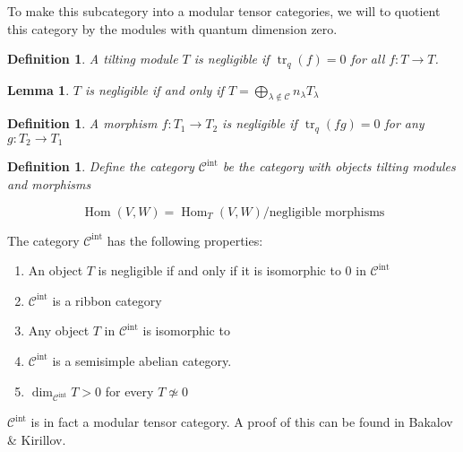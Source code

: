 \documentclass[]{article}
\newtheorem{defn}[theorem]{Definition}
\newtheorem{lemma}[theorem]{Lemma}
\newcommand{\tr}{\operatorname{tr}}
\newcommand{\Hom}{\operatorname{Hom}}
\numberwithin{equation}{subsection}
\begin{document}
To make this subcategory into a modular tensor categories, we will to quotient
this category by the modules with quantum dimension zero. 

\begin{defn}
    A tilting module $T$ is \emph{negligible} if $\tr_q(f) = 0$ for all $f: T \to T$.
\end{defn}
\begin{lemma}
    $T$ is negligible if and only if $T = \bigoplus _{\lambda \notin \mathcal{C}} n_\lambda T_\lambda$
\end{lemma}

\begin{defn}
    A morphism $f: T_1 \to T_2$ is \emph{negligible} if $\tr_q(fg) = 0$ for any $g: T_2 \to T_1$
\end{defn}

\begin{defn}
    Define the category $\mathcal{C}^\text{int}$ be the category with objects tilting modules and morphisms 

    \begin{equation*}
        \Hom(V,W) = \Hom_T(V,W) / \text{negligible morphisms}
    \end{equation*}
\end{defn}

The category $\mathcal{C}^\text{int}$ has the following properties:
\begin{enumerate}
    \item An object $T$ is negligible if and only if it is isomorphic to 0 in $\mathcal{C}^\text{int}$
    \item  $\mathcal{C}^\text{int}$ is a ribbon category
    \item Any object $T$ in $\mathcal{C}^\text{int}$ is isomorphic to %
    \item $\mathcal{C}^\text{int}$ is a semisimple abelian category. 
    \item $\dim_{\mathcal{C}^\text{int}} T > 0$ for every $T \not\simeq 0$
\end{enumerate}

$\mathcal{C}^\text{int}$ is in fact a modular tensor category. A proof of this
can be found in Bakalov \& Kirillov. %
 

\end{document}
